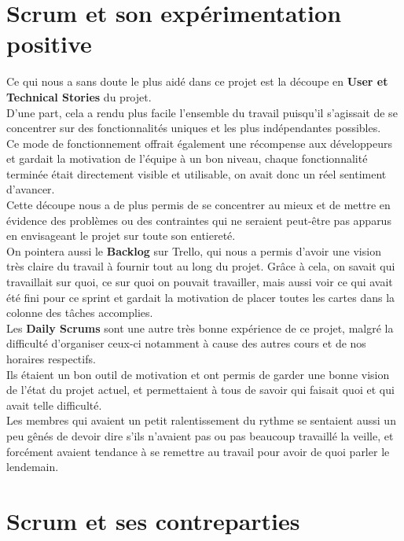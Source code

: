 \documentclass{report}
\begin{document}
	\section{Scrum et son expérimentation positive}

		Ce qui nous a sans doute le plus aidé dans ce projet est la découpe en \textbf{User et Technical Stories} du projet.\\
		D'une part, cela a rendu plus facile l'ensemble du travail puisqu'il s'agissait de se concentrer sur des fonctionnalités uniques et les plus indépendantes possibles.\\
		Ce mode de fonctionnement offrait également une récompense aux développeurs et gardait la motivation de l'équipe à un bon niveau, chaque fonctionnalité terminée était directement visible et utilisable, on avait donc un réel sentiment d'avancer.\\
		Cette découpe nous a de plus permis de se concentrer au mieux et de mettre en évidence des problèmes ou des contraintes qui ne seraient peut-être pas apparus en envisageant le projet sur toute son entiereté.\\

		On pointera aussi le \textbf{Backlog} sur Trello, qui nous a permis d'avoir une vision très claire du travail à fournir tout au long du projet. Grâce à cela, on savait qui travaillait sur quoi, ce sur quoi on pouvait travailler, mais aussi voir ce qui avait été fini pour ce sprint et gardait la motivation de placer toutes les cartes dans la colonne des tâches accomplies.\\

		Les \textbf{Daily Scrums} sont une autre très bonne expérience de ce projet, malgré la difficulté d'organiser ceux-ci notamment à cause des autres cours et de nos horaires respectifs.\\
		Ils étaient un bon outil de motivation et ont permis de garder une bonne vision de l'état du projet actuel, et permettaient à tous de savoir qui faisait quoi et qui avait telle difficulté.\\
		Les membres qui avaient un petit ralentissement du rythme se sentaient aussi un peu gênés de devoir dire s'ils n'avaient pas ou pas beaucoup travaillé la veille, et forcément avaient tendance à se remettre au travail pour avoir de quoi parler le lendemain.\\

	\section{Scrum et ses contreparties}
\end{document}
